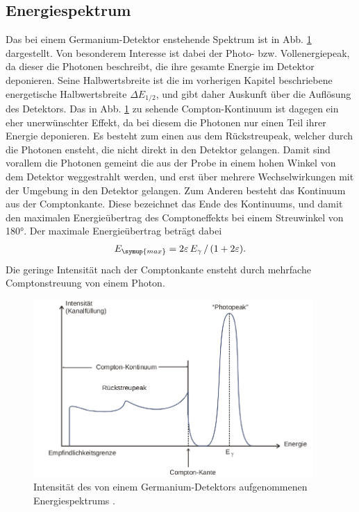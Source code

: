     \subsection{Energiespektrum}

    Das bei einem Germanium-Detektor enstehende Spektrum ist in Abb. \ref{fig:spektrum}
    dargestellt. Von besonderem Interesse ist dabei der Photo- bzw. Vollenergiepeak, da
    dieser die Photonen beschreibt, die ihre gesamte Energie im Detektor deponieren.
    Seine Halbwertsbreite ist die im vorherigen Kapitel beschriebene energetische Halbwertsbreite
    $\Delta E_{1/2}$, und gibt daher Auskunft über die Auflösung des Detektors.
    Das in Abb. \ref{fig:spektrum} zu sehende Compton-Kontinuum ist dagegen ein eher
    unerwünschter Effekt, da bei diesem die Photonen nur einen Teil ihrer Energie deponieren.
    Es besteht zum einen aus dem Rückstreupeak, welcher durch die Photonen ensteht, die
    nicht direkt in den Detektor gelangen. Damit sind vorallem die Photonen gemeint die
    aus der Probe in einem hohen Winkel von dem Detektor weggestrahlt werden, und erst über mehrere
    Wechselwirkungen mit der Umgebung in den Detektor gelangen. Zum Anderen besteht das
    Kontinuum aus der Comptonkante. Diese bezeichnet das Ende des Kontinuums, und damit den
    maximalen Energieübertrag des Comptoneffekts bei einem Streuwinkel von 180°. Der
    maximale Energieübertrag beträgt dabei
    \begin{align}
      E_{\symup{max}} = 2\varepsilon\,E_\gamma\,/\,(1+2\varepsilon).
    \end{align}
    Die geringe Intensität nach der Comptonkante ensteht durch mehrfache Comptonstreuung
    von einem Photon.\\
    \begin{figure}
      \centering
      \includegraphics[width=0.95\textwidth]{spektrum.png}
      \caption{Intensität des von einem Germanium-Detektors aufgenommenen
       Energiespektrums  \cite{anleitungv18}.}
      \label{fig:spektrum}
    \end{figure}


